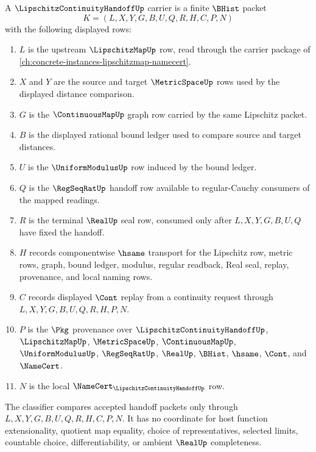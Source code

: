 \begin{definition}
\label{def:lipschitz-carrier}
A $\LipschitzContinuityHandoffUp$ carrier is a finite $\BHist$ packet
$$
K=(L,X,Y,G,B,U,Q,R,H,C,P,N)
$$
with the following displayed rows:
\begin{enumerate}
\item $L$ is the upstream $\LipschitzMapUp$ row, read through the carrier package of \autoref{ch:concrete-instances-lipschitzmap-namecert}.
\item $X$ and $Y$ are the source and target $\MetricSpaceUp$ rows used by the displayed distance comparison.
\item $G$ is the $\ContinuousMapUp$ graph row carried by the same Lipschitz packet.
\item $B$ is the displayed rational bound ledger used to compare source and target distances.
\item $U$ is the $\UniformModulusUp$ row induced by the bound ledger.
\item $Q$ is the $\RegSeqRatUp$ handoff row available to regular-Cauchy consumers of the mapped readings.
\item $R$ is the terminal $\RealUp$ seal row, consumed only after $L,X,Y,G,B,U,Q$ have fixed the handoff.
\item $H$ records componentwise $\hsame$ transport for the Lipschitz row, metric rows, graph, bound ledger, modulus, regular readback, Real seal, replay, provenance, and local naming rows.
\item $C$ records displayed $\Cont$ replay from a continuity request through $L,X,Y,G,B,U,Q,R,H,P,N$.
\item $P$ is the $\Pkg$ provenance over $\LipschitzContinuityHandoffUp$, $\LipschitzMapUp$, $\MetricSpaceUp$, $\ContinuousMapUp$, $\UniformModulusUp$, $\RegSeqRatUp$, $\RealUp$, $\BHist$, $\hsame$, $\Cont$, and $\NameCert$.
\item $N$ is the local $\NameCert_{\LipschitzContinuityHandoffUp}$ row.
\end{enumerate}
The classifier compares accepted handoff packets only through $L,X,Y,G,B,U,Q,R,H,C,P,N$. It has no coordinate for host function extensionality, quotient map equality, choice of representatives, selected limits, countable choice, differentiability, or ambient $\RealUp$ completeness.
\end{definition}

